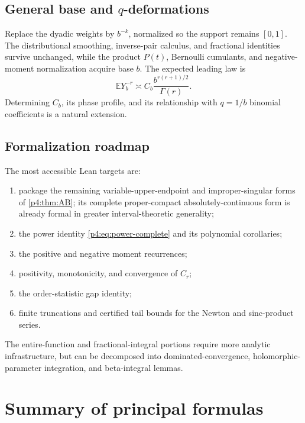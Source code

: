 \documentclass[11pt,oneside]{article}
\theoremstyle{definition}
\theoremstyle{remark}
\newcommand{\E}{\mathbb E}
\newcommand{\1}{\mathbf 1}
\begin{document}
\subsection{General base and \texorpdfstring{\(q\)}{q}-deformations}

Replace the dyadic weights by \(b^{-k}\), normalized so the support remains \([0,1]\).
The distributional smoothing, inverse-pair calculus, and fractional identities survive
unchanged, while the product \(P(t)\), Bernoulli cumulants, and negative-moment
normalization acquire base \(b\).  The expected leading law is
\begin{equation}\label{p4:eq:baseb-heuristic}
 \E Y_b^{-r}
 \asymp C_b\frac{b^{r(r+1)/2}}{\Gamma(r)}.
\end{equation}
Determining \(C_b\), its phase profile, and its relationship with \(q=1/b\) binomial
coefficients is a natural extension.

\subsection{Formalization roadmap}

The most accessible Lean targets are:
\begin{enumerate}
\item package the remaining variable-upper-endpoint and improper-singular forms of
      \cref{p4:thm:AB}; its complete proper-compact absolutely-continuous form is already
      formal in greater interval-theoretic generality;
\item the power identity \cref{p4:eq:power-complete} and its polynomial corollaries;
\item the positive and negative moment recurrences;
\item positivity, monotonicity, and convergence of \(C_r\);
\item the order-statistic gap identity;
\item finite truncations and certified tail bounds for the Newton and sinc-product
series.
\end{enumerate}
The entire-function and fractional-integral portions require more analytic infrastructure,
but can be decomposed into dominated-convergence, holomorphic-parameter integration,
and beta-integral lemmas.

\section{Summary of principal formulas}
\end{document}
